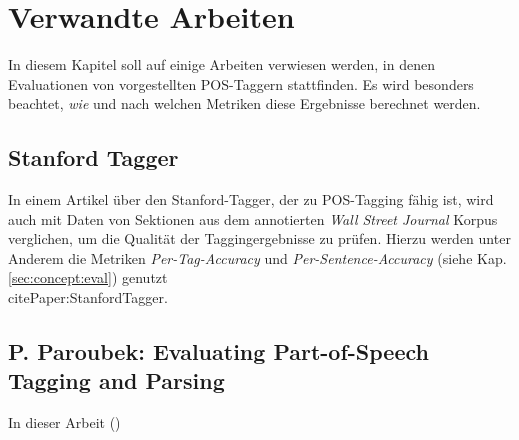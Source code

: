 %
\chapter{Verwandte Arbeiten}
\label{sec:related}

In diesem Kapitel soll auf einige Arbeiten verwiesen werden, in denen Evaluationen von vorgestellten POS-Taggern stattfinden. Es wird besonders beachtet, \textit{wie} und nach welchen Metriken diese Ergebnisse berechnet werden.


\section{Stanford Tagger}
\label{sec:related:stanford}
In einem Artikel über den Stanford-Tagger, der zu POS-Tagging fähig ist, wird auch mit Daten von Sektionen aus dem annotierten \textit{Wall Street Journal} Korpus verglichen, um die Qualität der Taggingergebnisse zu prüfen. Hierzu werden unter Anderem die Metriken \textit{Per-Tag-Accuracy} und \textit{Per-Sentence-Accuracy} (siehe Kap. \ref{sec:concept:eval}) genutzt \\cite{Paper:StanfordTagger}.

\section{P. Paroubek: Evaluating Part-of-Speech Tagging and Parsing}

In dieser Arbeit (\cite{Paroubek})







